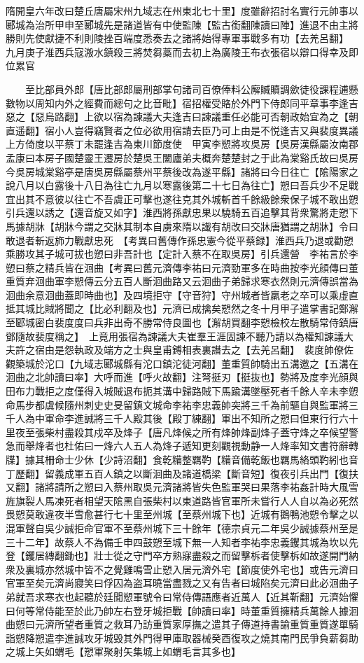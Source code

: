 隋開皇六年改曰楚丘唐屬宋州九域志在州東北七十里】度雖辭招討名實行元帥事以郾城為治所甲申至郾城先是諸道皆有中使監陳【監古銜翻陳讀曰陣】進退不由主將勝則先使獻捷不利則陵挫百端度悉奏去之諸將始得專軍事戰多有功【去羌呂翻】　九月庚子淮西兵寇溵水鎮殺三將焚芻藁而去初上為廣陵王布衣張宿以辯口得幸及即位累官

　　至比部員外郎【唐比部郎屬刑部掌句諸司百僚俸料公廨贓贖調歛徒役課程逋懸數物以周知内外之經費而總句之比音毗】宿招權受賂於外門下侍郎同平章事李逢吉惡之【惡烏路翻】上欲以宿為諫議大夫逢吉曰諫議重任必能可否朝政始宜為之【朝直遥翻】宿小人豈得竊賢者之位必欲用宿請去臣乃可上由是不悦逢吉又與裴度異議上方倚度以平蔡丁未罷逢吉為東川節度使　甲寅李愬將攻吳房【吳房漢縣屬汝南郡孟康曰本房子國楚靈王遷房於楚吳王闔廬弟夫概奔楚楚封之于此為棠谿氏故曰吳房今吳房城棠谿亭是唐吳房縣屬蔡州平蔡後改為遂平縣】諸將曰今日往亡【隂陽家之說八月以白露後十八日為往亡九月以寒露後第二十七日為往亡】愬曰吾兵少不足戰宜出其不意彼以往亡不吾虞正可擊也遂往克其外城斬首千餘級餘衆保子城不敢出愬引兵還以誘之【還音旋又如字】淮西將孫獻忠果以驍騎五百追擊其背衆驚將走愬下馬據胡牀【胡牀今謂之交牀其制本自虜來隋以䜟有胡改曰交牀唐猶謂之胡牀】令曰敢退者斬返斾力戰獻忠死　【考異曰舊傳作孫忠憲今從平蔡録】淮西兵乃退或勸愬乘勝攻其子城可拔也愬曰非吾計也【定計入蔡不在取吳房】引兵還營　李祐言於李愬曰蔡之精兵皆在洄曲【考異曰舊元濟傳李祐曰元濟勁軍多在時曲按李光顔傳曰董重質弃洄曲軍李愬傳云分五百人斷洄曲路又云洄曲子弟歸求寒衣然則元濟傳誤當為洄曲余意洄曲蓋即時曲也】及四境拒守【守音狩】守州城者皆羸老之卒可以乘虛直抵其城比賊將聞之【比必利翻及也】元濟已成擒矣愬然之冬十月甲子遣掌書記鄭澥至郾城密白裴度度曰兵非出奇不勝常侍良圖也【澥胡買翻李愬檢校左散騎常侍鎮唐鄧隨故裴度稱之】　上竟用張宿為諫議大夫崔羣王涯固諫不聽乃請以為權知諫議大夫許之宿由是怨執政及端方之士與皇甫鎛相表裏譖去之【去羌呂翻】　裴度帥僚佐觀築城於沱口【九域志郾城縣有沱口鎮沱徒河翻】董重質帥騎出五溝邀之【五溝在洄曲之北帥讀曰率】大呼而進【呼火故翻】注弩挺刃【挺抜也】勢將及度李光顔與田布力戰拒之度僅得入城賊退布扼其溝中歸路賊下馬踰溝墜壓死者千餘人辛未李愬命馬步都虞候隨州刺史史旻留鎮文城命李祐李忠義帥突將三千為前驅自與監軍將三千人為中軍命李進誠將三千人殿其後【殿丁練翻】軍出不知所之愬曰但東行行六十里夜至張柴村盡殺其戍卒及烽子【唐凡烽候之所有烽帥烽副烽子蓋守烽之卒候望警急而舉烽者也杜佑曰一烽六人五人為烽子遞知更刻觀視動静一人烽率知文書符辭轉牒】據其柵命士少休【少詩沼翻】食乾糒整羈靮【糒音備乾飯也羈馬絡頭靮紖也音丁歷翻】留義成軍五百人鎮之以斷洄曲及諸道橋梁【斷音短】復夜引兵出門【復扶又翻】諸將請所之愬曰入蔡州取吳元濟諸將皆失色監軍哭曰果落李祐姦計時大風雪旌旗裂人馬凍死者相望天隂黑自張柴村以東道路皆官軍所未嘗行人人自以為必死然畏愬莫敢違夜半雪愈甚行七十里至州城【至蔡州城下也】近城有鵝鴨池愬令擊之以混軍聲自吳少誠拒命官軍不至蔡州城下三十餘年【德宗貞元二年吳少誠據蔡州至是三十二年】故蔡人不為備壬申四鼓愬至城下無一人知者李祐李忠義钁其城為坎以先登【钁居縳翻鋤也】壯士從之守門卒方熟寐盡殺之而留擊柝者使擊柝如故遂開門納衆及裏城亦然城中皆不之覺雞鳴雪止愬入居元濟外宅【節度使外宅也】或告元濟曰官軍至矣元濟尚寢笑曰俘囚為盗耳曉當盡戮之又有告者曰城陷矣元濟曰此必洄曲子弟就吾求寒衣也起聽於廷聞愬軍號令曰常侍傳語應者近萬人【近其靳翻】元濟始懼曰何等常侍能至於此乃帥左右登牙城拒戰【帥讀曰率】時董重質擁精兵萬餘人據洄曲愬曰元濟所望者重質之救耳乃訪重質家厚撫之遣其子傳道持書諭重質重質遂單騎詣愬降愬遣李進誠攻牙城毁其外門得甲庫取器械癸酉復攻之燒其南門民爭負薪芻助之城上矢如蝟毛【愬軍聚射矢集城上如蝟毛言其多也】